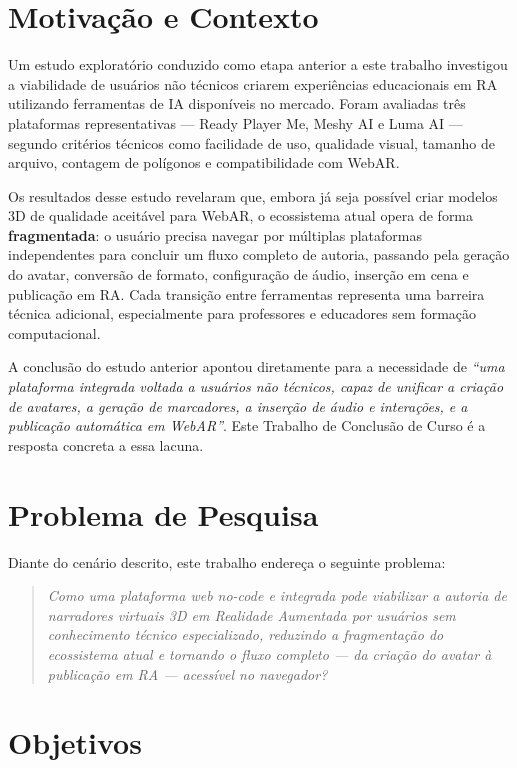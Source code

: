 \documentclass[
  12pt,
  openright,
  twoside,
  a4paper,
  english,
  brazil
]{abntex2}
\begin{document}
\section{Motivação e Contexto}
\label{sec:motivacao}

Um estudo exploratório conduzido como etapa anterior a este trabalho
\cite{freitas2025benchmark} investigou a viabilidade de usuários não técnicos
criarem experiências educacionais em RA utilizando ferramentas de IA
disponíveis no mercado. Foram avaliadas três plataformas representativas —
Ready Player Me, Meshy AI e Luma AI — segundo critérios técnicos como
facilidade de uso, qualidade visual, tamanho de arquivo, contagem de
polígonos e compatibilidade com WebAR.

Os resultados desse estudo revelaram que, embora já seja possível criar
modelos 3D de qualidade aceitável para WebAR, o ecossistema atual opera
de forma \textbf{fragmentada}: o usuário precisa navegar por múltiplas
plataformas independentes para concluir um fluxo completo de autoria,
passando pela geração do avatar, conversão de formato, configuração de
áudio, inserção em cena e publicação em RA. Cada transição entre ferramentas
representa uma barreira técnica adicional, especialmente para professores
e educadores sem formação computacional.

A conclusão do estudo anterior apontou diretamente para a necessidade de
\textit{``uma plataforma integrada voltada a usuários não técnicos, capaz
de unificar a criação de avatares, a geração de marcadores, a inserção
de áudio e interações, e a publicação automática em WebAR''}.
Este Trabalho de Conclusão de Curso é a resposta concreta a essa lacuna.

\section{Problema de Pesquisa}
\label{sec:problema}

Diante do cenário descrito, este trabalho endereça o seguinte problema:

\begin{quote}
  \textit{Como uma plataforma web no-code e integrada pode viabilizar a
  autoria de narradores virtuais 3D em Realidade Aumentada por usuários
  sem conhecimento técnico especializado, reduzindo a fragmentação do
  ecossistema atual e tornando o fluxo completo — da criação do avatar
  à publicação em RA — acessível no navegador?}
\end{quote}

\section{Objetivos}
\label{sec:objetivos}
\end{document}
